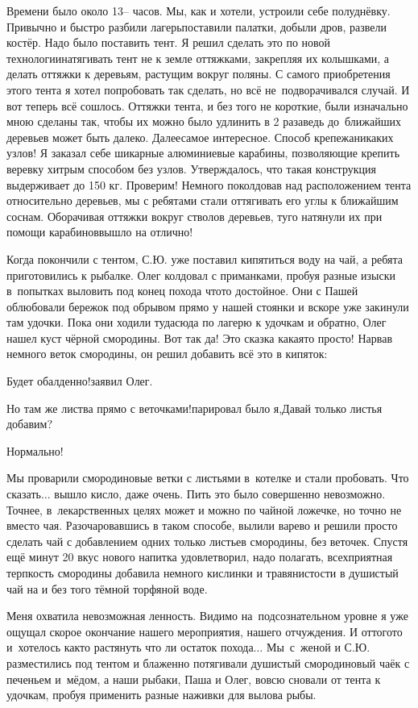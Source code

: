 Времени было около 13\thinspace\nobreakdash-- часов. Мы, как и хотели, устроили себе полуднёвку. Привычно и быстро разбили лагерь\mdash поставили палатки, добыли дров, развели костёр. Надо было поставить тент. Я решил сделать это по новой технологии\mdash натягивать тент не к земле оттяжками, закрепляя их колышками, а делать оттяжки к деревьям, растущим вокруг поляны. С самого приобретения этого тента я хотел попробовать так сделать, но всё не~подворачивался случай. И вот теперь всё сошлось. Оттяжки тента, и без того не короткие, были изначально мною сделаны так, чтобы их можно было удлинить в 2 раза\mdash ведь до~ближайших деревьев может быть далеко. Далее\mdash самое интересное. Способ крепежа\mdash никаких узлов! Я заказал себе шикарные алюминиевые карабины, позволяющие крепить веревку хитрым способом без узлов. Утверждалось, что такая конструкция выдерживает до 150 кг. Проверим! Немного поколдовав над расположением тента относительно деревьев, мы с ребятами стали оттягивать его углы к ближайшим соснам. Оборачивая оттяжки вокруг стволов деревьев, туго натянули их при помощи карабинов\mdash вышло на отлично!

Когда покончили с тентом, С.Ю. уже поставил кипятиться воду на чай, а ребята приготовились к рыбалке. Олег колдовал с приманками, пробуя разные изыски в~попытках выловить под конец похода что\sdash то достойное. Они с Пашей облюбовали бережок под обрывом прямо у нашей стоянки и вскоре уже закинули там удочки. Пока они ходили туда\sdash сюда по лагерю к удочкам и обратно, Олег нашел куст чёрной смородины. Вот так да! Это сказка какая\sdash то просто! Нарвав немного веток смородины, он решил добавить всё это в кипяток:

\diagdash Будет обалденно!\mdash заявил Олег.

\diagdash Но там же листва прямо с веточками!\mdash парировал было я,\mdash Давай только листья добавим?

\diagdash Нормально!

Мы проварили смородиновые ветки с листьями в~котелке и стали пробовать. Что сказать$\ldots$ вышло кисло, даже очень. Пить это было совершенно невозможно. Точнее, в~лекарственных целях может и можно по чайной ложечке, но точно не вместо чая. Разочаровавшись в таком способе, вылили варево и решили просто сделать чай с добавлением одних только листьев смородины, без веточек. Спустя ещё минут 20 вкус нового напитка удовлетворил, надо полагать, всех\mdash приятная терпкость смородины добавила немного кислинки и травянистости в душистый чай на и без того тёмной торфяной воде. 

Меня охватила невозможная ленность. Видимо на~подсознательном уровне я уже ощущал скорое окончание нашего мероприятия, нашего отчуждения. И оттого\sdash то и~хотелось как\sdash то растянуть что ли остаток похода$\ldots$ Мы~с~женой и С.Ю. разместились под тентом и блаженно потягивали душистый смородиновый чаёк с печеньем и~мёдом, а наши рыбаки, Паша и Олег, вовсю сновали от тента к удочкам, пробуя применить разные наживки для вылова рыбы.



\begin{center}
\end{center}

